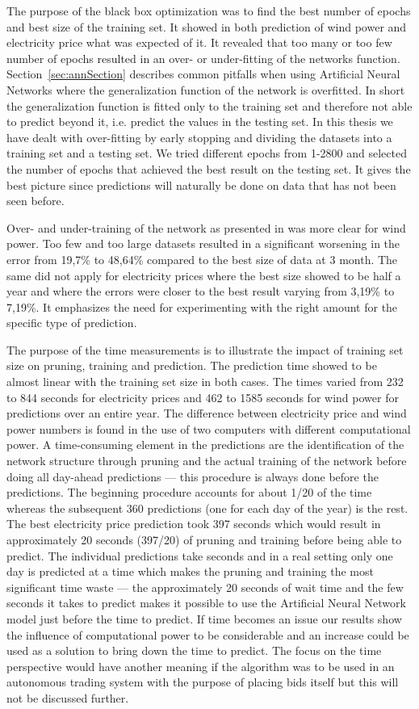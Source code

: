 The purpose of the black box optimization was to find the best number of epochs and best size of the training set. It showed in both prediction of wind power and electricity price what was expected of it. It revealed that too many or too few number of epochs resulted in an over- or under-fitting of the networks function. Section~\ref{sec:annSection} describes common pitfalls when using Artificial Neural Networks where the generalization function of the network is overfitted. In short the generalization function is fitted only to the training set and therefore not able to predict beyond it, i.e. predict the values in the testing set. In this thesis we have dealt with over-fitting by early stopping and dividing the datasets into a training set and a testing set. We tried different epochs from 1-2800 and selected the number of epochs that achieved the best result on the testing set. It gives the best picture since predictions will naturally be done on data that has not been seen before. 

Over- and under-training of the network as presented in\cite{1} was more clear for wind power. Too few  and too large datasets resulted in a significant worsening in the error from 19,7\% to 48,64\% compared to the best size of data at 3 month. The same did not apply for electricity prices where the best size showed to be half a year and where the errors were closer to the best result varying from 3,19\% to 7,19\%. It emphasizes the need for experimenting with the right amount for the specific type of prediction.

The purpose of the time measurements is to illustrate the impact of training set size on pruning, training and prediction. The prediction time showed to be almost linear with the training set size in both cases. The times varied from 232 to 844 seconds for electricity prices and 462 to 1585 seconds for wind power for predictions over an entire year. The difference between electricity price and wind power numbers is found in the use of two computers with different computational power. A time-consuming element in the predictions are the identification of the network structure through pruning and the actual training of the network before doing all day-ahead predictions --- this procedure is always done before the predictions. The beginning procedure accounts for about 1/20 of the time whereas the subsequent 360 predictions (one for each day of the year) is the rest. The best electricity price prediction took 397 seconds which would result in approximately 20 seconds (397/20) of pruning and training before being able to predict. The individual predictions take seconds and in a real setting only one day is predicted at a time which makes the pruning and training the most significant time waste --- the approximately 20 seconds of wait time and the few seconds it takes to predict makes it possible to use the Artificial Neural Network model just before the time to predict. If time becomes an issue our results show the influence of computational power to be considerable and an increase could be used as a solution to bring down the time to predict. The focus on the time perspective would have another meaning if the algorithm was to be used in an autonomous trading system with the purpose of placing bids itself but this will not be discussed further.  